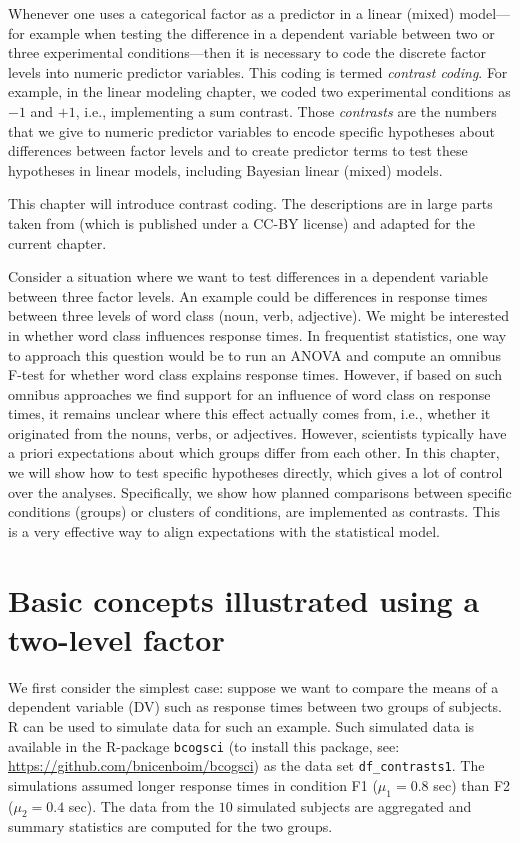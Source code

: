 \documentclass[12pt,]{krantz}
\begin{document}
Whenever one uses a categorical factor as a predictor in a linear (mixed) model---for example when testing the difference in a dependent variable between two or three experimental conditions---then it is necessary to code the discrete factor levels into numeric predictor variables. This coding is termed \emph{contrast coding}. For example, in the linear modeling chapter, we coded two experimental conditions as \(-1\) and \(+1\), i.e., implementing a sum contrast. Those \emph{contrasts} are the numbers that we give to numeric predictor variables to encode specific hypotheses about differences between factor levels and to create predictor terms to test these hypotheses in linear models, including Bayesian linear (mixed) models.

This chapter will introduce contrast coding. The descriptions are in large parts taken from \citet{schad2020capitalize} (which is published under a CC-BY license) and adapted for the current chapter.

Consider a situation where we want to test differences in a dependent variable between three factor levels. An example could be differences in response times between three levels of word class (noun, verb, adjective). We might be interested in whether word class influences response times. In frequentist statistics, one way to approach this question would be to run an ANOVA and compute an omnibus F-test for whether word class explains response times. However, if based on such omnibus approaches we find support for an influence of word class on response times, it remains unclear where this effect actually comes from, i.e., whether it originated from the nouns, verbs, or adjectives. However, scientists typically have a priori expectations about which groups differ from each other. In this chapter, we will show how to test specific hypotheses directly, which gives a lot of control over the analyses. Specifically, we show how planned comparisons between specific conditions (groups) or clusters of conditions, are implemented as contrasts. This is a very effective way to align expectations with the statistical model.

\hypertarget{basic-concepts-illustrated-using-a-two-level-factor}{%
\section{Basic concepts illustrated using a two-level factor}\label{basic-concepts-illustrated-using-a-two-level-factor}}

We first consider the simplest case: suppose we want to compare the means of a dependent variable (DV) such as response times between two groups of subjects. R can be used to simulate data for such an example. Such simulated data is available in the R-package \texttt{bcogsci} (to install this package, see: \url{https://github.com/bnicenboim/bcogsci}) as the data set \texttt{df\_contrasts1}. The simulations assumed longer response times in condition F1 (\(\mu_1 = 0.8\) sec) than F2 (\(\mu_2 = 0.4\) sec). The data from the \(10\) simulated subjects are aggregated and summary statistics are computed for the two groups.
\end{document}
